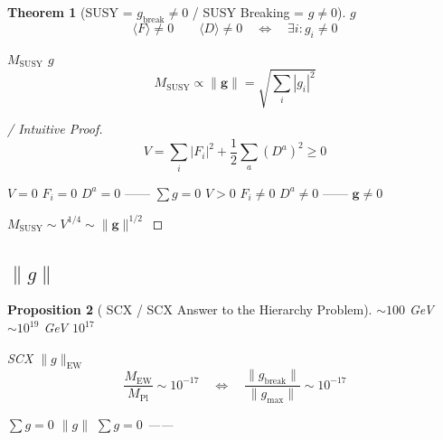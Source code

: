 \documentclass[12pt,a4paper]{article}
\theoremstyle{plain}
\newtheorem{theorem}{ Theorem}[section]
\newtheorem{proposition}[theorem]{ Proposition}
\theoremstyle{definition}
\newcommand{\gv}{\mathbf{g}}
\begin{document}

\subsection{}

\begin{theorem}[SUSY  = $g_{\text{break}} \neq 0$ / SUSY Breaking = $g \neq 0$]
 $g$ 
\begin{equation}
    \langle F \rangle \neq 0 \quad \text{} \quad \langle D \rangle \neq 0
    \quad \Longleftrightarrow \quad
    \exists i : g_i \neq 0
\end{equation}

 $M_{\text{SUSY}}$  $g$ 
\begin{equation}
    M_{\text{SUSY}} \propto \| \gv \| = \sqrt{\sum_i |g_i|^2}
\end{equation}
\end{theorem}

\begin{proof}[ / Intuitive Proof]

\begin{equation}
    V = \sum_i |F_i|^2 + \frac{1}{2}\sum_a (D^a)^2 \geq 0
\end{equation}

$V = 0$  $F_i = 0$  $D^a = 0$ ——  $\sum g = 0$
$V > 0$  $F_i \neq 0$  $D^a \neq 0$ ——  $\gv \neq 0$

 $M_{\text{SUSY}} \sim V^{1/4} \sim \|\gv\|^{1/2}$
\end{proof}


\subsection{ $\|g\|$ }

\begin{proposition}[ SCX  / SCX Answer to the Hierarchy Problem]
$\sim 100$ GeV$\sim 10^{19}$ GeV
 $10^{17}$ 

 SCX  $\|g\|_{\text{EW}}$ 
\begin{equation}
    \frac{M_{\text{EW}}}{M_{\text{Pl}}} \sim 10^{-17}
    \quad \Longleftrightarrow \quad
    \frac{\|g_{\text{break}}\|}{\|g_{\text{max}}\|} \sim 10^{-17}
\end{equation}

\textbf{}  $\sum g = 0$ \textbf{}
\textbf{}
$\|g\|$  $\sum g = 0$ ——
\textbf{}
\end{proposition}
\end{document}

